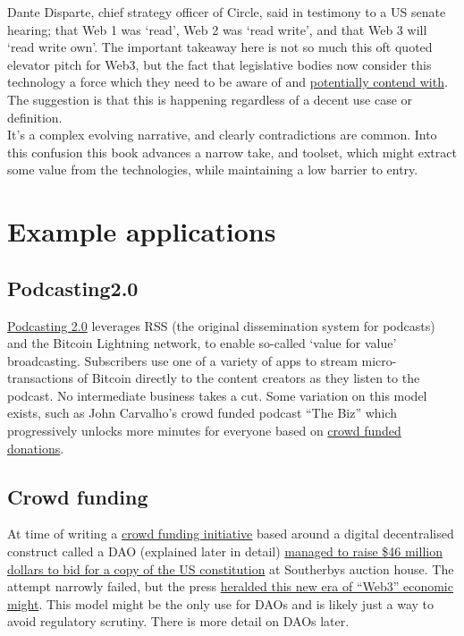 Dante Disparte, chief strategy officer of Circle, said in testimony to a US senate hearing; that Web 1 was `read', Web 2 was `read write', and that Web 3 will `read write own'. The important takeaway here is not so much this oft quoted elevator pitch for Web3, but the fact that legislative bodies now consider this technology a force which they need to be aware of and \href{https://a16z.com/2021/12/17/prediction-for-the-new-year-a-web3-midterm/}{potentially contend with}. The suggestion is that this is happening regardless of a decent use case or definition.\\
It's a complex evolving narrative, and clearly contradictions are common. Into this confusion this book advances a narrow take, and toolset, which might extract some value from the technologies, while maintaining a low barrier to entry.\\ 

\section{Example applications}
\subsection{Podcasting2.0}
\href{https://medium.com/@everywheretrip/an-introduction-to-podcasting-2-0-3c4f61ea17f4}{Podcasting 2.0} leverages RSS (the original dissemination system for podcasts) and the Bitcoin Lightning network, to enable so-called `value for value' broadcasting. Subscribers use one of a variety of apps to stream micro-transactions of Bitcoin directly to the content creators as they listen to the podcast. No intermediate business takes a cut. Some variation on this model exists, such as John Carvalho's crowd funded podcast ``The Biz'' which progressively unlocks more minutes for everyone based on \href{https://thebiz.pro/about#crowdwall}{crowd funded donations}.
\subsection{Crowd funding}
At time of writing a \href{https://www.constitutiondao.com/}{crowd funding initiative} based around a digital decentralised construct called a DAO (explained later in detail) \href{https://www.coindesk.com/business/2021/12/06/daos-and-the-next-crowdfunding-gold-rush/}{managed to raise \$46 million dollars to bid for a copy of the US constitution} at Southerbys auction house. The attempt narrowly failed, but the press \href{https://www.coindesk.com/business/2021/12/09/what-kickstarter-going-decentralized-means-for-web-3/}{heralded this new era of ``Web3'' economic might}. This model might be the only use for DAOs and is likely just a way to avoid regulatory scrutiny. There is more detail on DAOs later.
